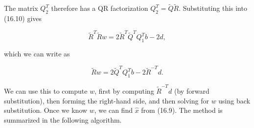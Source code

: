 The matrix \(Q_{2}^{T}\) therefore has a QR factorization \(Q_{2}^{T}=\tilde{Q}\tilde{R}\). Substituting this into (16.10) gives

\[\tilde{R}^{T}\tilde{R}w=2\tilde{R}^{T}\tilde{Q}^{T}Q_{1}^{T}b-2d,\]

which we can write as

\[\tilde{R}w=2\tilde{Q}^{T}Q_{1}^{T}b-2\tilde{R}^{-T}d.\]

We can use this to compute \(w\), first by computing \(\tilde{R}^{-T}d\) (by forward substitution), then forming the right-hand side, and then solving for \(w\) using back substitution. Once we know \(w\), we can find \(\hat{x}\) from (16.9). The method is summarized in the following algorithm.

 